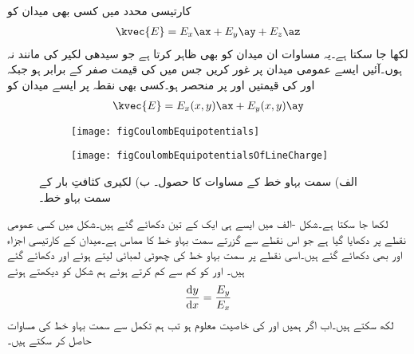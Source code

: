 کارتیسی محدد میں کسی بھی میدان کو
\begin{align*}
\kvec{E}=E_x\ax+E_y\ay+E_z\az
\end{align*}
لکھا جا سکتا ہے۔یہ مساوات ان میدان کو بھی ظاہر کرتا ہے جو سیدھی لکیر کی مانند نہ ہوں۔آئیں ایسے عمومی میدان پر غور کریں جس میں  کی قیمت صفر کے برابر ہو جبکہ  اور  کی قیمتیں  اور  پر منحصر ہو۔کسی بھی نقطہ  پر ایسے میدان کو
\begin{align}\label{مساوات_کولمب_عمومی_مارتیسی_میدان}
\kvec{E}=E_x(x,y)\ax+E_y(x,y)\ay
\end{align}
%
\begin{figure}
\centering
\begin{subfigure}{0.5\textwidth}
\centering
\texttt{[image: figCoulombEquipotentials]}
\end{subfigure}%
%
\begin{subfigure}{0.5\textwidth}
\centering
\texttt{[image: figCoulombEquipotentialsOfLineCharge]}
\end{subfigure}%
\caption{الف) سمت بہاو خط کے مساوات کا حصول۔ ب) لکیری کثافتِ بار کے سمت بہاو خط۔}
\label{شکل_کولمب_سمت_بہاو_خط}
\end{figure}
لکھا  جا سکتا ہے۔شکل -الف میں ایسے ہی ایک  کے تین  دکھائے گئے ہیں۔شکل میں کسی عمومی نقطے پر  دکھایا گیا ہے جو اس نقطے سے  گزرتے سمت بہاو خط کا مماس ہے۔میدان کے کارتیسی اجزاء  اور  بھی دکھائے گئے ہیں۔اسی نقطے پر سمت بہاو خط کی چھوٹی لمبائی لیتے ہوئے  اور  دکھائے گئے ہیں۔ اور   کو کم سے کم کرتے ہوئے ہم شکل کو دیکھتے ہوئے
\begin{align}\label{مساوات_کولمب_سمت_بہاو_کارتیسی}
\frac{\dif y}{\dif x}=\frac{E_y}{E_x}
\end{align}
لکھ سکتے ہیں۔اب اگر ہمیں  اور  کی خاصیت معلوم ہو تب ہم تکمل سے سمت بہاو خط کی مساوات حاصل کر سکتے ہیں۔

